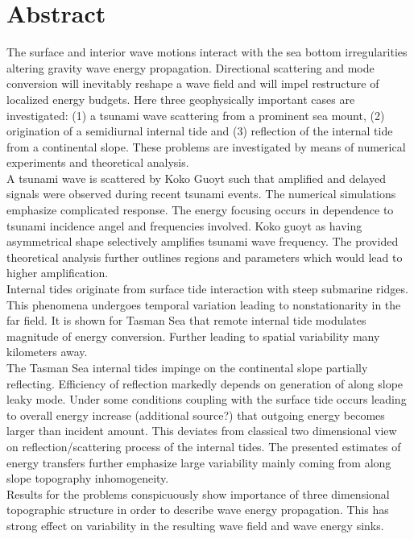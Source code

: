 \section*{Abstract}
The surface and interior wave motions interact with the sea bottom irregularities altering gravity wave energy propagation. Directional scattering and mode conversion will inevitably reshape a wave field and will impel restructure of localized energy budgets. Here three geophysically important cases are investigated: (1) a tsunami wave scattering from a prominent sea mount, (2)   origination of a semidiurnal internal tide and (3) reflection of the internal tide from a continental slope. These problems are investigated by means of numerical experiments and theoretical analysis.\\
A tsunami wave is scattered by Koko Guoyt such that amplified and delayed signals were observed during recent tsunami events. The numerical simulations emphasize complicated response. The energy focusing occurs in dependence to tsunami incidence angel and frequencies involved. Koko guoyt as having asymmetrical shape selectively amplifies tsunami wave frequency. The provided theoretical analysis further outlines regions and parameters which would lead to higher amplification.\\
Internal tides originate from surface tide interaction with steep submarine ridges. This phenomena undergoes temporal variation leading to nonstationarity in the far field. It is shown for Tasman Sea that remote internal tide modulates magnitude of energy conversion. Further leading to spatial variability many kilometers away.\\
The Tasman Sea internal tides impinge on the continental slope partially reflecting. Efficiency of reflection markedly depends on generation of along slope leaky mode. Under some conditions coupling with the surface tide occurs leading to overall energy increase (additional source?) that outgoing energy becomes larger than incident amount. This deviates from classical two dimensional view on reflection/scattering process of the internal tides. The presented estimates of energy transfers further emphasize large variability mainly coming from along slope topography inhomogeneity.\\
Results for the problems conspicuously show importance of three dimensional topographic structure in order to describe wave energy propagation. This has strong effect on variability in the resulting wave field and wave energy sinks.

